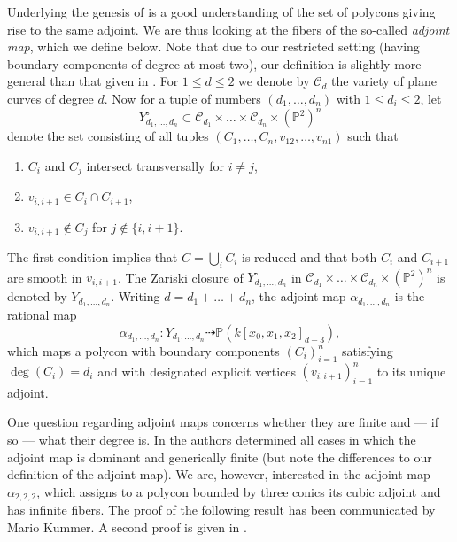 \documentclass[a4paper,10pt]{amsart}
\theoremstyle{definition}
\theoremstyle{plain}
\newcommand{\cC}{{\mathcal C}}
\newcommand{\pp}{\mathbb{P}}
\begin{document}
Underlying the genesis of  is a good understanding of the set of polycons giving rise to the same adjoint. We are thus looking at the fibers of the so-called \emph{adjoint map}, which we define below. Note that due to our restricted setting (having boundary components of degree at most two), our definition is slightly more general than that given in \cite[\S4]{KohnEtAl2024AdjCurves}. For $1 \leq d \leq 2$ we denote by $\cC_d$ the variety of plane curves of degree $d$. Now for a tuple of numbers $(d_1, \dots, d_n)$ with $1 \leq d_i \leq 2$, let
\begin{equation*}
    Y_{d_1, \dots, d_n}^\circ \subset \cC_{d_1} \times \dots \times \cC_{d_n} \times (\pp^2)^n
\end{equation*}
denote the set consisting of all tuples $(C_1, \dots, C_n, v_{12}, \dots, v_{n1})$ such that
\begin{enumerate}
    \item $C_i$ and $C_j$ intersect transversally for $i \neq j$,
    \item $v_{i,i+1} \in C_i \cap C_{i+1}$,
    \item $v_{i,i+1} \not \in C_j$ for $j \not\in \{i,i+1\}$.
\end{enumerate}
The first condition implies that $C = \bigcup_i C_i$ is reduced and that both $C_i$ and $C_{i+1}$ are smooth in $v_{i,i+1}$. The Zariski closure of $Y_{d_1, \dots, d_n}^\circ$ in $\cC_{d_1} \times \dots \times \cC_{d_n} \times (\pp^2)^n$ is denoted by $Y_{d_1, \dots, d_n}$. Writing $d = d_1 + \dots + d_n$, the adjoint map $\alpha_{d_1, \dots, d_n}$ is the rational map
\begin{equation*}
    \alpha_{d_1, \dots, d_n} \colon Y_{d_1, \dots, d_n} \dashrightarrow \pp(k[x_0,x_1,x_2]_{d-3}),
\end{equation*}
which maps a polycon with boundary components $(C_i)_{i=1}^n$ satisfying $\deg(C_i) = d_i$ and with designated explicit vertices $(v_{i,i+1})_{i=1}^n$ to its unique adjoint.

One question regarding adjoint maps concerns whether they are finite and --- if so --- what their degree is. In \cite{KohnEtAl2024AdjCurves} the authors determined all cases in which the adjoint map is dominant and generically finite (but note the differences to our definition of the adjoint map). We are, however, interested in the adjoint map $\alpha_{2,2,2}$, which assigns to a polycon bounded by three conics its cubic adjoint and has infinite fibers. The proof of the following result has been communicated by Mario Kummer. A second proof is given in .
\end{document}
